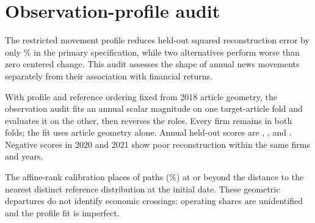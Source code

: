 \section{Observation-profile audit}\label{app:observation-audit}

The restricted movement profile reduces held-out squared reconstruction error
by only \% in the primary
specification, while two alternatives perform worse than zero centered change.
This audit assesses the shape of annual news movements separately from their
association with financial returns.



With profile and reference ordering fixed from 2018 article geometry,
the observation audit fits an annual scalar magnitude on one target-article
fold and evaluates it on the other, then reverses the roles.
Every firm remains in both folds; the fit uses article geometry alone.
Annual held-out scores are ,
,  and
.
Negative scores in 2020 and 2021 show poor reconstruction within the same
firms and years.

The affine-rank calibration places  of
 paths
(\%)
at or beyond the distance to the nearest distinct reference distribution at
the initial date.
These geometric departures do not identify economic crossings: operating
shares are unidentified and the profile fit is imperfect.
